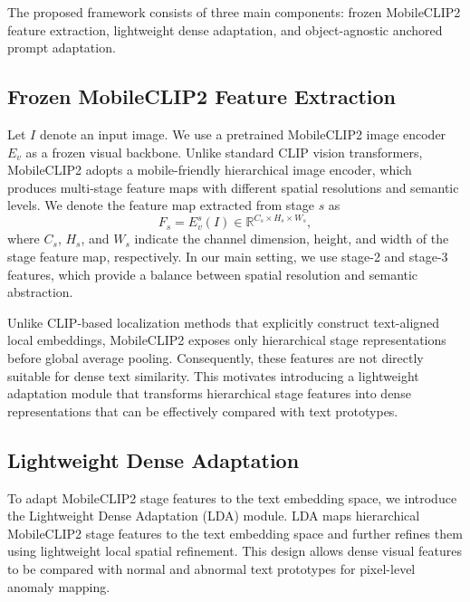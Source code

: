 \documentclass[10pt]{article}
\begin{document}
The proposed framework consists of three main components: frozen MobileCLIP2 feature extraction, lightweight dense adaptation, and object-agnostic anchored prompt adaptation.

\subsection{Frozen MobileCLIP2 Feature Extraction}

Let $I$ denote an input image. We use a pretrained MobileCLIP2 image encoder $E_v$ as a frozen visual backbone. Unlike standard CLIP vision transformers, MobileCLIP2 adopts a mobile-friendly hierarchical image encoder, which produces multi-stage feature maps with different spatial resolutions and semantic levels. We denote the feature map extracted from stage $s$ as
\begin{equation}
F_s = E_v^s(I) \in \mathbb{R}^{C_s \times H_s \times W_s},
\label{eq:stage_feature}
\end{equation}
where $C_s$, $H_s$, and $W_s$ indicate the channel dimension, height, and width of the stage feature map, respectively. In our main setting, we use stage-2 and stage-3 features, which provide a balance between spatial resolution and semantic abstraction.

Unlike CLIP-based localization methods that explicitly construct text-aligned local embeddings, MobileCLIP2 exposes only hierarchical stage representations before global average pooling. Consequently, these features are not directly suitable for dense text similarity. This motivates introducing a lightweight adaptation module that transforms hierarchical stage features into dense representations that can be effectively compared with text prototypes.

\subsection{Lightweight Dense Adaptation}

To adapt MobileCLIP2 stage features to the text embedding space, we introduce the Lightweight Dense Adaptation (LDA) module. LDA maps hierarchical MobileCLIP2 stage features to the text embedding space and further refines them using lightweight local spatial refinement. This design allows dense visual features to be compared with normal and abnormal text prototypes for pixel-level anomaly mapping.
\end{document}
